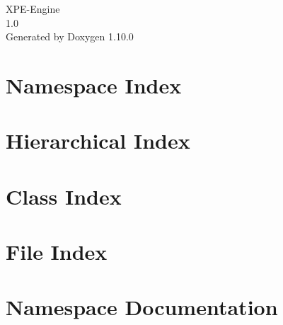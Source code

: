\documentclass[twoside]{book}
\newcommand{\+}{\discretionary{\mbox{\scriptsize$\hookleftarrow$}}{}{}}
\newcommand{\clearemptydoublepage}{%
    \newpage{\pagestyle{empty}\cleardoublepage}%
  }
\begin{document}
  \raggedbottom
    \hypersetup{pageanchor=false,
                bookmarksnumbered=true,
                pdfencoding=unicode
               }
  \begin{titlepage}
  \vspace*{7cm}
  \begin{center}%
  {\Large XPE-\/\+Engine}\\
  [1ex]\large 1.\+0 \\
  \vspace*{1cm}
  {\large Generated by Doxygen 1.10.0}\\
  \end{center}
  \end{titlepage}
  \clearemptydoublepage
  \tableofcontents
  \clearemptydoublepage
  \hypersetup{pageanchor=true}
\chapter{Namespace Index}

\chapter{Hierarchical Index}

\chapter{Class Index}

\chapter{File Index}

\chapter{Namespace Documentation}













\end{document}
